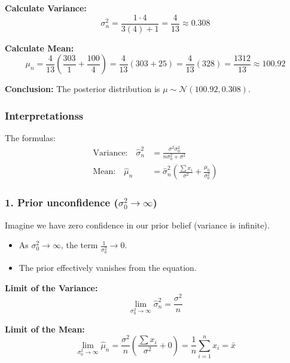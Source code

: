 \documentclass[../Probability.tex]{subfiles}
\begin{document}
\noindent\textbf{Calculate Variance:}
\begin{equation*}
\sigma_n^2 = \frac{1 \cdot 4}{3(4) + 1} = \frac{4}{13} \approx 0.308
\end{equation*}

\noindent\textbf{Calculate Mean:}
\begin{equation*}
\mu_n = \frac{4}{13} \left( \frac{303}{1} + \frac{100}{4} \right) = \frac{4}{13} (303 + 25) = \frac{4}{13}(328) = \frac{1312}{13} \approx 100.92
\end{equation*}

\noindent\textbf{Conclusion:}
The posterior distribution is $\mu \sim \mathcal{N}(100.92, 0.308)$.

\subsubsection{Interpretationss}
The formulas:
\begin{align*}
\text{Variance:} \quad \hat{\sigma}_n^2 &= \frac{\sigma^2 \sigma_0^2}{n\sigma_0^2 + \sigma^2} \\
\text{Mean:} \quad \hat{\mu}_n &= \hat{\sigma}_n^2 \left( \frac{\sum x_i}{\sigma^2} + \frac{\mu_0}{\sigma_0^2} \right)
\end{align*}

\subsubsection*{1. Prior unconfidence ($\sigma_0^2 \to \infty$)}
Imagine we have zero confidence in our prior belief (variance is infinite).
\begin{itemize}
    \item As $\sigma_0^2 \to \infty$, the term $\frac{1}{\sigma_0^2} \to 0$.
    \item The prior effectively vanishes from the equation.
\end{itemize}

\noindent\textbf{Limit of the Variance:}
\begin{equation*}
\lim_{\sigma_0^2 \to \infty} \hat{\sigma}_n^2 = \frac{\sigma^2}{n}
\end{equation*}

\noindent\textbf{Limit of the Mean:}
\begin{equation*}
\lim_{\sigma_0^2 \to \infty} \hat{\mu}_n = \frac{\sigma^2}{n} \left( \frac{\sum x_i}{\sigma^2} + 0 \right) = \frac{1}{n} \sum_{i=1}^{n} x_i = \bar{x}
\end{equation*}
\end{document}
